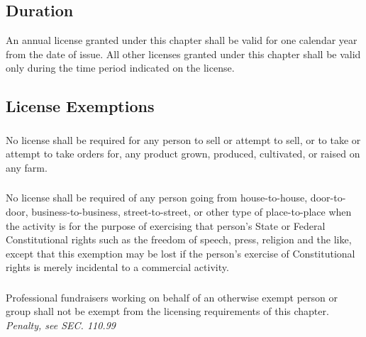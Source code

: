 \subsection{Duration}
An annual license granted under this chapter shall be valid for one calendar year from the date of issue. All other licenses granted under this chapter shall be valid only during the time period indicated on the license.
\subsection{License Exemptions}
\subsubsection{}
No license shall be required for any person to sell or attempt to sell, or to take or attempt to take orders for, any product grown, produced, cultivated, or raised on any farm.
\subsubsection{}
No license shall be required of any person going from house-to-house, door-to-door, business-to-business, street-to-street, or other type of place-to-place when the activity is for the purpose of exercising that person’s State or Federal Constitutional rights such as the freedom of speech, press, religion and the like, except that this exemption may be lost if the person’s exercise of Constitutional rights is merely incidental to a commercial activity.
\subsubsection{}
Professional fundraisers working on behalf of an otherwise exempt person or group shall not be exempt from the licensing requirements of this chapter.\\
\emph{Penalty, see SEC. 110.99}
